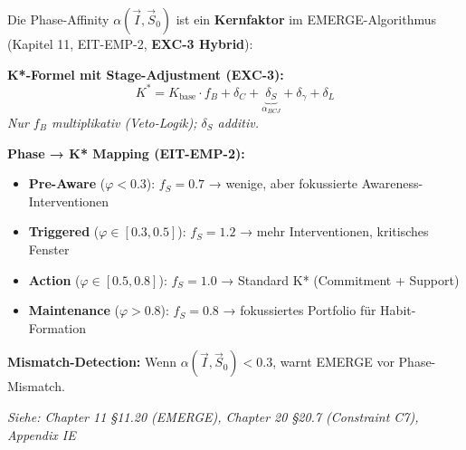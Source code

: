 \begin{tcolorbox}[colback=blue!5!white, colframe=blue!75!black,
    title=\textbf{Cross-Reference: EMERGE Algorithm \& Phase-K* (Chapter 11, 20)}]

Die Phase-Affinity $\alpha(\vec{I}, \vec{S}_0)$ ist ein \textbf{Kernfaktor} im EMERGE-Algorithmus (Kapitel 11, EIT-EMP-2, \textbf{EXC-3 Hybrid}):

\vspace{0.2cm}
\textbf{K*-Formel mit Stage-Adjustment (EXC-3):}
\begin{equation*}
K^* = K_{\text{base}} \cdot f_B + \delta_C + \underbrace{\delta_S}_{\alpha_{BCJ}} + \delta_\gamma + \delta_L
\end{equation*}
\textit{Nur $f_B$ multiplikativ (Veto-Logik); $\delta_S$ additiv.}

\textbf{Phase → K* Mapping (EIT-EMP-2):}
\begin{itemize}[nosep]
\item \textbf{Pre-Aware} ($\varphi < 0.3$): $f_S = 0.7$ → wenige, aber fokussierte Awareness-Interventionen
\item \textbf{Triggered} ($\varphi \in [0.3, 0.5]$): $f_S = 1.2$ → mehr Interventionen, kritisches Fenster
\item \textbf{Action} ($\varphi \in [0.5, 0.8]$): $f_S = 1.0$ → Standard K* (Commitment + Support)
\item \textbf{Maintenance} ($\varphi > 0.8$): $f_S = 0.8$ → fokussiertes Portfolio für Habit-Formation
\end{itemize}

\vspace{0.2cm}
\textbf{Mismatch-Detection:} Wenn $\alpha(\vec{I}, \vec{S}_0) < 0.3$, warnt EMERGE vor Phase-Mismatch.

\vspace{0.2cm}
\textit{Siehe: Chapter 11 §11.20 (EMERGE), Chapter 20 §20.7 (Constraint C7), Appendix IE}
\end{tcolorbox}


